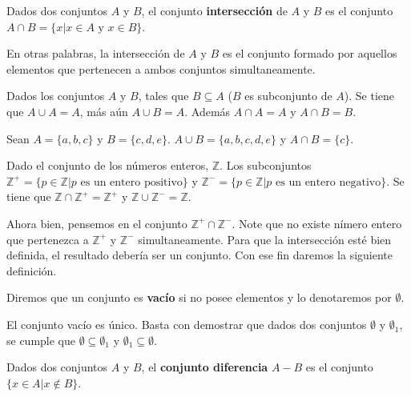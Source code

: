 \documentclass[12pt,]{krantz}
\theoremstyle{definition}
\theoremstyle{definition}
\theoremstyle{definition}
\theoremstyle{remark}
\let\BeginKnitrBlock\begin \let\EndKnitrBlock\end
\begin{document}
\BeginKnitrBlock{definition}
\protect\hypertarget{def:intersecciondeconjuntos}{}{\label{def:intersecciondeconjuntos}
}Dados dos conjuntos \(A\) y \(B\), el conjunto \textbf{intersección} de
\(A\) y \(B\) es el conjunto
\(A\cap B = \{ x| x\in A \mbox{ y } x\in B \}\).
\EndKnitrBlock{definition}

En otras palabras, la intersección de \(A\) y \(B\) es el conjunto
formado por aquellos elementos que pertenecen a ambos conjuntos
simultaneamente.

\BeginKnitrBlock{example}
\protect\hypertarget{exm:unnamed-chunk-11}{}{\label{exm:unnamed-chunk-11}
}Dados los conjuntos \(A\) y \(B\), tales que \(B\subseteq A\) (\(B\) es
subconjunto de \(A\)). Se tiene que \(A\cup A=A\), más aún
\(A\cup B=A\). Además \(A\cap A=A\) y \(A\cap B=B\).
\EndKnitrBlock{example}

\BeginKnitrBlock{example}
\protect\hypertarget{exm:unnamed-chunk-12}{}{\label{exm:unnamed-chunk-12}
}Sean \(A=\{a,b,c\}\) y \(B=\{c,d,e\}\). \(A\cup B=\{a,b,c,d,e\}\) y
\(A\cap B=\{c\}\).
\EndKnitrBlock{example}

\BeginKnitrBlock{example}
\protect\hypertarget{exm:unnamed-chunk-13}{}{\label{exm:unnamed-chunk-13}
}Dado el conjunto de los números enteros, \(\mathbb{Z}\). Los
subconjuntos
\(\mathbb{Z}^{+}=\{p\in\mathbb{Z}| p \mbox{ es un entero positivo} \}\)
y
\(\mathbb{Z}^{-}=\{p\in\mathbb{Z}| p \mbox{ es un entero negativo} \}\).
Se tiene que \(\mathbb{Z}\cap \mathbb{Z}^{+}=\mathbb{Z}^{+}\) y
\(\mathbb{Z}\cup \mathbb{Z}^{-}=\mathbb{Z}\).

Ahora bien, pensemos en el conjunto
\(\mathbb{Z}^{+}\cap\mathbb{Z}^{-}\). Note que no existe nímero entero
que pertenezca a \(\mathbb{Z}^{+}\) y \(\mathbb{Z}^{-}\)
simultaneamente. Para que la intersección esté bien definida, el
resultado debería ser un conjunto. Con ese fin daremos la siguiente
definición.
\EndKnitrBlock{example}

\BeginKnitrBlock{definition}
\protect\hypertarget{def:conjuntovacio}{}{\label{def:conjuntovacio} }Diremos
que un conjunto es \textbf{vacío} si no posee elementos y lo denotaremos
por \(\emptyset\).
\EndKnitrBlock{definition}

\BeginKnitrBlock{remark}
{}El conjunto vacío es único. Basta con demostrar
que dados dos conjuntos \(\emptyset\) y \(\emptyset_{1}\), se cumple que
\(\emptyset\subseteq \emptyset_{1}\) y
\(\emptyset_{1}\subseteq\emptyset\).
\EndKnitrBlock{remark}

\BeginKnitrBlock{definition}
\protect\hypertarget{def:conjuntodiferencia}{}{\label{def:conjuntodiferencia}
}Dados dos conjuntos \(A\) y \(B\), el \textbf{conjunto diferencia}
\(A-B\) es el conjunto \(\{x\in A | x\notin B \}\).
\EndKnitrBlock{definition}
\end{document}
